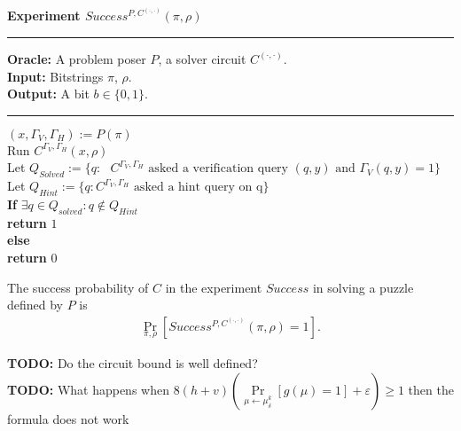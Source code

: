 %
%
\begin{codeblock}
  \textbf{Experiment $Success^{P, C^{(\cdot, \cdot)}}(\pi, \rho) $}
  \medskip
  \hrule
  \medskip
  \textbf{Oracle:} A problem poser $P$, a solver circuit $C^{(\cdot,\cdot)}$.\\
  \textbf{Input:}  Bitstrings $\pi$, $\rho$.\\
  \textbf{Output:} A bit $b \in \{0,1\}$.
  \medskip\hrule\medskip
  $(x, \Gamma_V, \Gamma_H) := P(\pi)$ \\
  Run $C^{\Gamma_V,\Gamma_H}(x, \rho)$ \\
  \IndI Let $Q_{Solved} := \{q: \text{ $C^{\Gamma_V, \Gamma_H}$ asked a verification query $(q,y)$ and $\Gamma_V(q, y) = 1$} \}$\\
  \IndI Let $Q_{Hint} := \{q: \text{$C^{\Gamma_V, \Gamma_H}$ asked a hint query on q} \}$\\
  \textbf{If} $\exists q \in Q_{solved} : q \notin Q_{Hint}$ \then \\
  \IndI \textbf{return} $1$\\
  \textbf{else} \\
  \IndI \textbf{return} $0$\\
\end{codeblock}
%
The success probability of $C$ in the experiment $Success$ in solving a puzzle defined by $P$ is
\begin{align}
 \underset{\pi, \rho}{\Pr}[Success^{P,C^{(\cdot, \cdot)}}(\pi, \rho) = 1].
\end{align}
%
\begin{todo}
  \textbf{TODO:} Do the circuit bound is well defined?\\
  \textbf{TODO:} What happens when $8(h+v) \left(\underset{\mu \leftarrow \mu_\delta^k}{\Pr}[g(\mu) = 1] + \varepsilon\right) \geq 1$ then the formula does not work\\
\end{todo}
%
